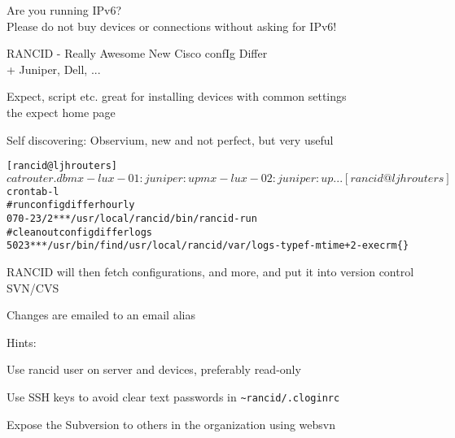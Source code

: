 \documentclass[28pt,landscape,a4paper,footrule]{foils}
\begin{document}
Are you running IPv6?\\
Please do not buy devices or connections without asking for IPv6!

\begin{slidelist}
\item RANCID - Really Awesome New Cisco confIg Differ\\
+ Juniper, Dell, ... 
\item Expect, script etc. great for installing devices with common settings\\
 the expect home page
\item Self discovering: Observium, new and not perfect, but very useful
\end{slidelist}



\begin{alltt}\footnotesize
[rancid@ljh routers]$ cat router.db 
mx-lux-01:juniper:up
mx-lux-02:juniper:up
...
[rancid@ljh routers]$ crontab -l
# run config differ hourly
07 0-23/2 * * * /usr/local/rancid/bin/rancid-run
# clean out config differ logs
50 23 * * * /usr/bin/find /usr/local/rancid/var/logs -type f -mtime +2 -exec rm \{\} 
\end{alltt}

\begin{slidelist}
\item RANCID will then fetch configurations, and more, and put it into version control SVN/CVS
\item Changes are emailed to an email alias
\end{slidelist}







\begin{slidelist}
\item Hints:
\item Use rancid user on server and devices, preferably read-only
\item Use SSH keys to avoid clear text passwords in \verb+~rancid/.cloginrc+
\item Expose the Subversion to others in the organization using websvn
\end{slidelist}
\end{document}
